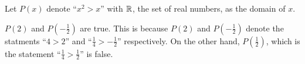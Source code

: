 \guard



\begin{exmp}
\label{exmp:predicateOverReals}
  Let $P(x)$ denote ``$x^2 > x$'' with $\mathbb{R}$, the set of real numbers, as the domain of $x$.

  $P(2)$ and $P(-\frac{1}{2})$ are true.
  This is because $P(2)$ and $P(-\frac{1}{2})$ denote the statments ``$4 > 2$'' and ``$\frac{1}{4} > -\frac{1}{2}$'' respectively.
  On the other hand, $P(\frac{1}{2})$, which is the statement ``$\frac{1}{4}>\frac{1}{2}$'' is false.
\end{exmp}
